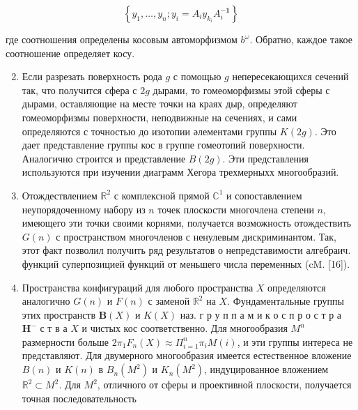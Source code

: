 \documentclass[10pt]{article}
\begin{document}
\[

\left\{y_{1}, \ldots, y_{n} ; y_{i}=A_{i} y_{k_{i}} A_{i}^{-\mathbf{1}}\right\}

\]



где соотношения определены косовым автоморфизмом $b^{\omega}$. Обратно, каждое такое соотношение определяет косу.



\begin{enumerate}

  \setcounter{enumi}{1}

  \item Если разрезать поверхность рода $g$ с помощью $g$ непересекающихся сечений так, что получится сфера с $2 g$ дырами, то гомеоморфизмы этой сферы с дырами, оставляющие на месте точки на краях дыр, определяют гомеоморфизмы поверхности, неподвижные на сечениях, и сами определяются с точностью до изотопии әлементами группы $K(2 g)$. Это дает представление группы кос в группе гомеотопий поверхности. Аналогично строится и представление $B(2 g)$. Эти представления используются при изучении диаграмм Хегора трехмерныхх многообразий.



  \item Отождествлением $\mathbb{R}^{2}$ с комплексной прямой $\mathbb{C}^{1}$ и сопоставлением неупорядоченному набору из $n$ точек плоскости многочлена степени $n$, имеющего эти точки своими корнями, получается возможность отождествить $G(n)$ с пространством многочленов с ненулевым дискриминантом. Так, этот факт позволил получить ряд результатов о непредставимости алгебраич. функций суперпозицией функций от меньшего числа переменных (cM. [16]).



  \item Пространства конфигураций для любого пространства $X$ определяются аналогично $G(n)$ и $F(n)$ с заменой $\mathbb{R}^{2}$ на $X$. Фундаментальные группы этих пространств $\boldsymbol{B}(X)$ и $K(X)$ наз. г р у п п а м и к о с п р о с т р а $\mathbf{H}^{-}$ с т в а $X$ и чистых кос соответственно. Для многообразия $M^{n}$ размерности больше $2 \pi_{1} F_{n}(X) \approx \Pi_{i=1}^{n} \pi_{i} M(i)$, и эти группы интереса не представляют. Для двумерного многообразия имеется естественное вложение $B(n)$ и $K(n)$ в $B_{n}\left(M^{2}\right)$ и $K_{n}\left(M^{2}\right)$, индуцированное вложением $\mathbb{R}^{2} \subset M^{2}$. Для $M^{2}$, отличного от сферы и проективной плоскости, получается точная последовательность



\end{enumerate}
\end{document}
